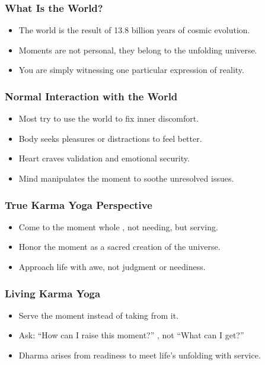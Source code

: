 \begin{frame}[fragile]\frametitle{What Is the World?}
  \begin{itemize}
    \item The world is the result of 13.8 billion years of cosmic evolution.
    \item Moments are not personal, they belong to the unfolding universe.
    \item You are simply witnessing one particular expression of reality.
  \end{itemize}
\end{frame}

\begin{frame}[fragile]\frametitle{Normal Interaction with the World}
  \begin{itemize}
    \item Most try to use the world to fix inner discomfort.
    \item Body seeks pleasures or distractions to feel better.
    \item Heart craves validation and emotional security.
    \item Mind manipulates the moment to soothe unresolved issues.
  \end{itemize}
\end{frame}

\begin{frame}[fragile]\frametitle{True Karma Yoga Perspective}
  \begin{itemize}
    \item Come to the moment whole ,  not needing, but serving.
    \item Honor the moment as a sacred creation of the universe.
    \item Approach life with awe, not judgment or neediness.
  \end{itemize}
\end{frame}

\begin{frame}[fragile]\frametitle{Living Karma Yoga}
  \begin{itemize}
    \item Serve the moment instead of taking from it.
    \item Ask: “How can I raise this moment?” ,  not “What can I get?”
    \item Dharma arises from readiness to meet life’s unfolding with service.
  \end{itemize}
\end{frame}

